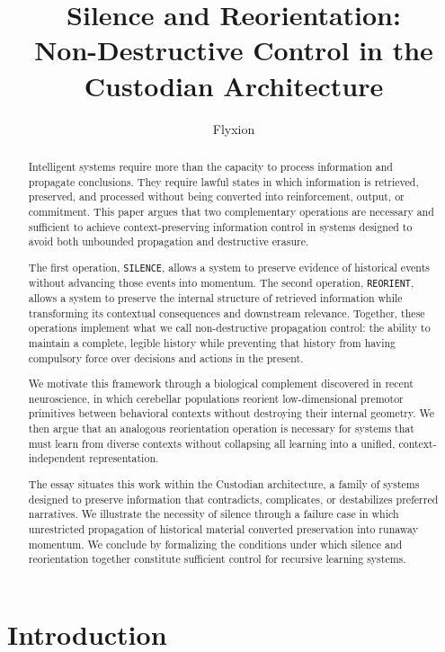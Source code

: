 \documentclass[12pt]{article}
\title{Silence and Reorientation: \\Non-Destructive Control in the Custodian Architecture}
\author{Flyxion}
\date{}
\begin{document}
\maketitle

\begin{abstract}

Intelligent systems require more than the capacity to process information and propagate conclusions. They require lawful states in which information is retrieved, preserved, and processed without being converted into reinforcement, output, or commitment. This paper argues that two complementary operations are necessary and sufficient to achieve context-preserving information control in systems designed to avoid both unbounded propagation and destructive erasure.

The first operation, \texttt{SILENCE}, allows a system to preserve evidence of historical events without advancing those events into momentum. The second operation, \texttt{REORIENT}, allows a system to preserve the internal structure of retrieved information while transforming its contextual consequences and downstream relevance. Together, these operations implement what we call non-destructive propagation control: the ability to maintain a complete, legible history while preventing that history from having compulsory force over decisions and actions in the present.

We motivate this framework through a biological complement discovered in recent neuroscience, in which cerebellar populations reorient low-dimensional premotor primitives between behavioral contexts without destroying their internal geometry. We then argue that an analogous reorientation operation is necessary for systems that must learn from diverse contexts without collapsing all learning into a unified, context-independent representation.

The essay situates this work within the Custodian architecture, a family of systems designed to preserve information that contradicts, complicates, or destabilizes preferred narratives. We illustrate the necessity of silence through a failure case in which unrestricted propagation of historical material converted preservation into runaway momentum. We conclude by formalizing the conditions under which silence and reorientation together constitute sufficient control for recursive learning systems.

\end{abstract}

\section{Introduction}
\end{document}
